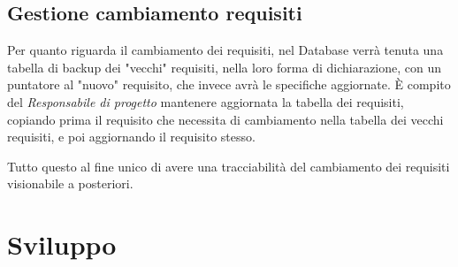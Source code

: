 \documentclass[a4paper]{report}
\begin{document}
			\subsection{Gestione cambiamento requisiti}
				Per quanto riguarda il cambiamento dei requisiti, nel Database verrà tenuta una tabella di backup dei "vecchi" requisiti, 
				nella loro forma di dichiarazione, con un puntatore al "nuovo" requisito, che invece avrà le specifiche aggiornate. È compito del
				\emph{Responsabile di progetto} mantenere aggiornata la tabella dei requisiti, copiando prima il requisito che necessita di cambiamento
				nella tabella dei vecchi requisiti, e poi aggiornando il requisito stesso.
				
				Tutto questo al fine unico di avere una tracciabilità del cambiamento dei requisiti visionabile a posteriori.
		\section{Sviluppo}
\end{document}
